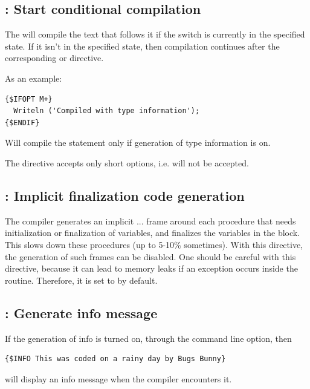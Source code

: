\subsection{ : Start conditional compilation}

The  will compile the text that follows it if the
switch  is currently in the specified state.
If it isn't in the specified state, then compilation continues after the
corresponding  or  directive.

As an example:
\begin{verbatim}
{$IFOPT M+}
  Writeln ('Compiled with type information');
{$ENDIF}
\end{verbatim}
Will compile the  statement only if generation of type information is on.

\begin{remark}The  directive accepts only short options,
i.e.  will not be accepted.
\end{remark}

\subsection{ : Implicit finalization code
generation}

The compiler generates an implicit ... frame around
each procedure that needs initialization or finalization of variables, and
finalizes the variables in the  block. This
slows down these procedures (up to 5-10\% sometimes). 
With this directive, the generation of such frames can be disabled. 
One should be careful with this directive, because it can lead to memory 
leaks if an exception occurs inside the routine. 
Therefore, it is set to  by default.

\subsection{ : Generate info message}

If the generation of info is turned on, through the  command line
option, then
\begin{verbatim}
{$INFO This was coded on a rainy day by Bugs Bunny}
\end{verbatim}
will display an info message when the compiler encounters it.

